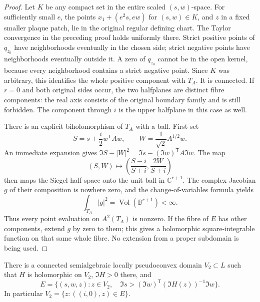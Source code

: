 \begin{proof}
Let $K$ be any compact set in the entire scaled $(s,w)$-space.  For sufficiently small $e$, the points $x_1+(e^2s,ew)$ for $(s,w)\in K$, and $z$ in a fixed smaller plaque patch, lie in the original regular defining chart.  The Taylor convergence in the preceding proof holds uniformly there.  Strict positive points of $q_{z_0}$ have neighborhoods eventually in the chosen side; strict negative points have neighborhoods eventually outside it.  A zero of $q_{z_0}$ cannot be in the open kernel, because every neighborhood contains a strict negative point.  Since $K$ was arbitrary, this identifies the whole positive component with $T_A$.  It is connected.  If $r=0$ and both original sides occur, the two halfplanes are distinct fibre components: the real axis consists of the original boundary family and is still forbidden.  The component through $i$ is the upper halfplane in this case as well.

There is an explicit biholomorphism of $T_A$ with a ball.  First set
\[
          S=s+\frac{i}{2}w^{\mathsf T}Aw,
          \qquad W=\frac1{\sqrt2}A^{1/2}w.
\]
An immediate expansion gives $\Im S-|W|^2=\Im s-(\Im w)^{\mathsf T}A\Im w$. The map
\[
          (S,W)\longmapsto
          \left(\frac{S-i}{S+i},\frac{2W}{S+i}\right)
\]
then maps the Siegel half-space onto the unit ball in $\mathbb{C}^{r+1}$. The complex Jacobian $g$ of their composition is nowhere zero, and the change-of-variables formula yields
\[
                     \int_{T_A}|g|^2
                       =\operatorname{Vol}(\mathbb{B}^{r+1})<\infty.
\]
Thus every point evaluation on $A^2(T_A)$ is nonzero.  If the fibre of $E$ has other components, extend $g$ by zero to them; this gives a holomorphic square-integrable function on that same whole fibre. No extension from a proper subdomain is being used.
\end{proof}

\begin{lemma}\label{lem:win-first-epigraph}
There is a connected semialgebraic locally pseudoconvex domain $V_2\subset L$ such that $H$ is holomorphic on $V_2$, $\Im H>0$ there, and
\begin{equation}\label{eq:win-epigraph}
 E=\{(s,w,z):z\in V_2,\quad
              \Im s>(\Im w)^{\mathsf T}(\Im H(z))^{-1}\Im w\}.
\end{equation}
In particular $V_2=\{z:((i,0),z)\in E\}$.
\end{lemma}

